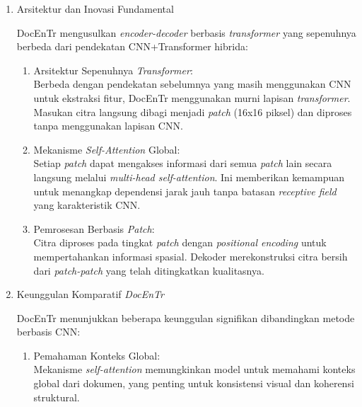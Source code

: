 \begin{enumerate}[leftmargin=*, labelindent=0pt, itemsep=1ex, topsep=0pt]

\item Arsitektur dan Inovasi Fundamental

DocEnTr mengusulkan \textit{encoder-decoder} berbasis \textit{transformer} yang sepenuhnya berbeda dari pendekatan CNN+Transformer hibrida:

\begin{enumerate}[leftmargin=1.5em, labelsep=0.5em, itemindent=0pt, label=\alph*., topsep=0pt, parsep=0pt, itemsep=0pt]
      \item Arsitektur Sepenuhnya \textit{Transformer}: \mbox{}\\[0.1em]
            Berbeda dengan pendekatan sebelumnya yang masih menggunakan CNN untuk ekstraksi fitur, DocEnTr menggunakan murni lapisan \textit{transformer}. Masukan citra langsung dibagi menjadi \textit{patch} (16x16 piksel) dan diproses tanpa menggunakan lapisan CNN.

      \item Mekanisme \textit{Self-Attention} Global: \mbox{}\\[0.1em]
            Setiap \textit{patch} dapat mengakses informasi dari semua \textit{patch} lain secara langsung melalui \textit{multi-head self-attention}. Ini memberikan kemampuan untuk menangkap dependensi jarak jauh tanpa batasan \textit{receptive field} yang karakteristik CNN.

      \item Pemrosesan Berbasis \textit{Patch}: \mbox{}\\[0.1em]
            Citra diproses pada tingkat \textit{patch} dengan \textit{positional encoding} untuk mempertahankan informasi spasial. Dekoder merekonstruksi citra bersih dari \textit{patch-patch} yang telah ditingkatkan kualitasnya.
\end{enumerate}

\item Keunggulan Komparatif \textit{DocEnTr}
\label{para:docentr-keunggulan}

DocEnTr menunjukkan beberapa keunggulan signifikan dibandingkan metode berbasis CNN:

\begin{enumerate}[leftmargin=1.5em, labelsep=0.5em, itemindent=0pt, label=\alph*., topsep=0pt, parsep=0pt, itemsep=0pt]
      \item Pemahaman Konteks Global: \mbox{}\\[0.1em]
            Mekanisme \textit{self-attention} memungkinkan model untuk memahami konteks global dari dokumen, yang penting untuk konsistensi visual dan koherensi struktural.


\end{enumerate}
\end{enumerate}
